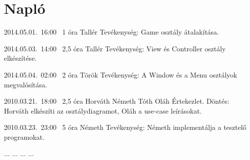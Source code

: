 %
\section{Napló}

\begin{naplo}

\bejegyzes
{2014.05.01.~16:00~}
{1 óra}
{Tallér}
{Tevékenység: Game osztály átalakítása.}

\bejegyzes
{2014.05.03.~14:00~}
{2,5 óra}
{Tallér}
{Tevékenység: View és Controller osztály elkészítése.}

\bejegyzes
{2014.05.04.~02:00~}
{2 óra}
{Török}
{Tevékenység: A Window és a Menu osztályok megvalósítása.}

\bejegyzes
{2010.03.21.~18:00~} %
{2,5 óra} %
{Horváth\newline
Németh\newline
Tóth\newline
Oláh} %
{Értekezlet. Döntés: Horváth elkészíti az osztálydiagramot, Oláh a use-case leírásokat.} %

\bejegyzes
{2010.03.23.~23:00~}
{5 óra}
{Németh}
{Tevékenység: Németh implementálja a tesztelő programokat.}

\bejegyzes
{...}
{...}
{...}
{...}


\end{naplo}

